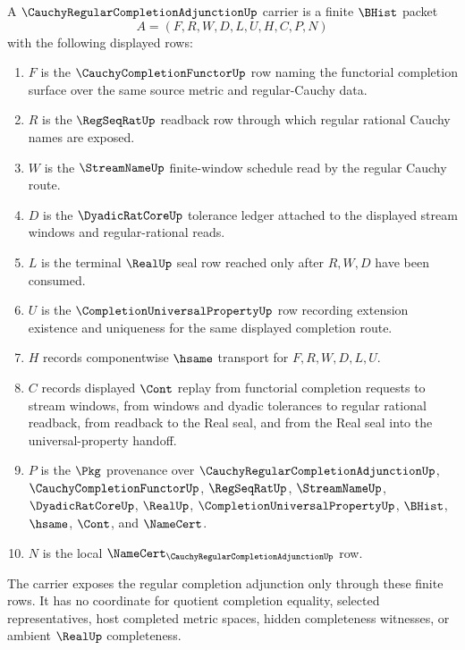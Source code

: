 \begin{definition}
\label{def:cauchy-regular-completion-adjunction-carrier}
A $\CauchyRegularCompletionAdjunctionUp$ carrier is a finite $\BHist$ packet
$$
A=(F,R,W,D,L,U,H,C,P,N)
$$
with the following displayed rows:
\begin{enumerate}
\item $F$ is the $\CauchyCompletionFunctorUp$ row naming the functorial completion surface over the same source metric and regular-Cauchy data.
\item $R$ is the $\RegSeqRatUp$ readback row through which regular rational Cauchy names are exposed.
\item $W$ is the $\StreamNameUp$ finite-window schedule read by the regular Cauchy route.
\item $D$ is the $\DyadicRatCoreUp$ tolerance ledger attached to the displayed stream windows and regular-rational reads.
\item $L$ is the terminal $\RealUp$ seal row reached only after $R,W,D$ have been consumed.
\item $U$ is the $\CompletionUniversalPropertyUp$ row recording extension existence and uniqueness for the same displayed completion route.
\item $H$ records componentwise $\hsame$ transport for $F,R,W,D,L,U$.
\item $C$ records displayed $\Cont$ replay from functorial completion requests to stream windows, from windows and dyadic tolerances to regular rational readback, from readback to the Real seal, and from the Real seal into the universal-property handoff.
\item $P$ is the $\Pkg$ provenance over $\CauchyRegularCompletionAdjunctionUp$, $\CauchyCompletionFunctorUp$, $\RegSeqRatUp$, $\StreamNameUp$, $\DyadicRatCoreUp$, $\RealUp$, $\CompletionUniversalPropertyUp$, $\BHist$, $\hsame$, $\Cont$, and $\NameCert$.
\item $N$ is the local $\NameCert_{\CauchyRegularCompletionAdjunctionUp}$ row.
\end{enumerate}
The carrier exposes the regular completion adjunction only through these finite rows. It has no coordinate for quotient completion equality, selected representatives, host completed metric spaces, hidden completeness witnesses, or ambient $\RealUp$ completeness.
\end{definition}


